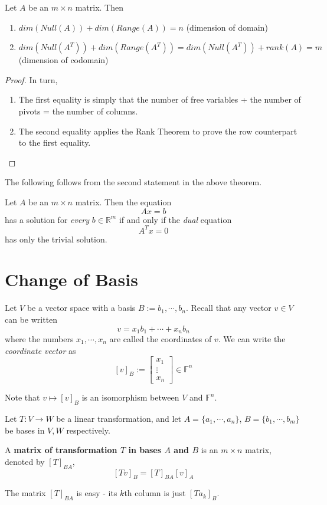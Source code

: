 \begin{theorem}
Let $A$ be an $m \times n$ matrix. Then 
\begin{enumerate}
	\item $dim(Null(A)) + dim(Range(A)) = n$ (dimension of domain)
	\item $dim(Null(A^{T})) + dim(Range(A^{T})) = dim(Null(A^{T})) + rank(A) = m$ (dimension of codomain)
\end{enumerate}
\end{theorem}

\begin{proof}
In turn, 
\begin{enumerate}
	\item The first equality is simply that the number of free variables + the number of pivots = the number of columns. 
	\item The second equality applies the Rank Theorem to prove the row counterpart to the first equality. 
\end{enumerate}
\end{proof}

The following follows from the second statement in the above theorem. 
\begin{theorem}
Let $A$ be an $m \times n$ matrix. Then the equation 
$$Ax = b$$ 
has a solution for \textit{every} $b \in \mathbb{R}^{m}$ if and only if the \textit{dual} equation 
$$A^{T}x = 0$$ 
has only the trivial solution. 
\end{theorem}

\section{Change of Basis}
Let $V$ be a vector space with a basis $B := b_{1}, \cdots, b_{n}$. Recall that any vector $v \in V$ can be written
$$v = x_{1} b_{1} + \cdots + x_{n} b_{n}$$
where the numbers $x_{1}, \cdots, x_{n}$ are called the coordinates of $v$. We can write the \textit{coordinate vector} as 
$$[v]_{B} := \begin{bmatrix}
x_{1} \\
\vdots \\
x_{n}
\end{bmatrix} \in \mathbb{F}^{n}$$

Note that $v \mapsto [v]_{B}$ is an isomorphism between $V$ and $\mathbb{F}^{n}$.

\begin{definition}
Let $T: V \rightarrow W$ be a linear transformation, and let $A = \{a_{1}, \cdots, a_{n}\}$, $B = \{ b_{1}, \cdots, b_{m} \}$ be bases in $V,W$ respectively. 

A \textbf{matrix of transformation $T$ in bases $A$ and $B$} is an $m \times n$ matrix, denoted by $[T]_{BA}$, 
$$[Tv]_{B} = [T]_{BA} [v]_{A}$$

The matrix $[T]_{BA}$ is easy - its $k$th column is just $[Ta_{k}]_{B}$. 
\end{definition}

